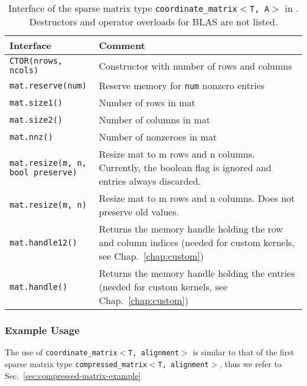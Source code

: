 \begin{table}[tb]
\begin{center}
\begin{tabular}{p{6.5cm}|p{8cm}}
Interface & Comment\\
\hline
\texttt{CTOR(nrows, ncols)}    & Constructor with number of rows and columns \\
\texttt{mat.reserve(num)}    & Reserve memory for \texttt{num} nonzero entries \\
\texttt{mat.size1()}            & Number of rows in mat \\
\texttt{mat.size2()}            & Number of columns in mat \\
\texttt{mat.nnz()}		& Number of nonzeroes in mat \\
\parbox{6cm}{\texttt{mat.resize(m, n, \\
           \hphantom{mat.resize(}bool preserve)}}    & Resize mat to m rows and n columns. Currently, the boolean flag is ignored and entries always discarded. \\
\texttt{mat.resize(m, n)}    & Resize mat to m rows and n columns. Does not preserve old values. \\
\texttt{mat.handle12()}  & Returns the memory handle holding the row and column indices (needed for custom kernels, see Chap.~\ref{chap:custom}) \\
\texttt{mat.handle()}  & Returns the memory handle holding the entries (needed for custom kernels, see Chap.~\ref{chap:custom})
\end{tabular}
\caption{Interface of the sparse matrix type \texttt{coordinate\_matrix$<$T, A$>$} in \ViennaCL. Destructors and operator overloads for BLAS are not listed.}
\label{tab:coordinate-matrix-interface}
\end{center}
\end{table}

\subsubsection{Example Usage}
The use of \texttt{coordinate\_matrix$<$T, alignment$>$} is similar to that of the first sparse matrix type
\texttt{compressed\_matrix$<$T, alignment$>$}, thus we refer to Sec.~\ref{sec:compressed-matrix-example}



